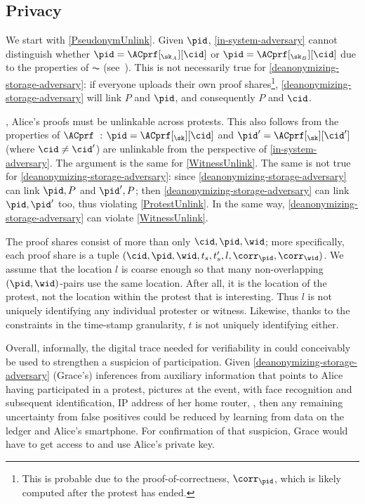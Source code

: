 \subsection{Privacy}

We start with \cref{PseudonymUnlink}.
Given \(\pid\), \cref{in-system-adversary} cannot distinguish whether \(\pid = 
  \ACprf[_{\sk_A}][\cid]\) or \(\pid = \ACprf[_{\sk_B}][\cid]\) due to the 
properties of \(\AC\) (see~\cite{HowToWinTheCloneWars}).
This is not necessarily true for \cref{deanonymizing-storage-adversary}:
if everyone uploads their own proof shares\footnote{%
  This is probable due to the proof-of-correctness, \(\corr_\pid\), which is 
  likely computed after the protest has ended.
}, \cref{deanonymizing-storage-adversary} will link \(P\) and \(\pid\), and 
consequently \(P\) and \(\cid\).

, Alice's proofs must be unlinkable across protests.
This also follows from the properties of 
\(\ACprf\)~\cite{HowToWinTheCloneWars}: \(\pid =  \ACprf[_{\sk}][\cid]\) and 
\(\pid' = \ACprf[_{\sk}][\cid']\) (where \(\cid \neq \cid'\)) are unlinkable 
from the perspective of \cref{in-system-adversary}.
The argument is the same for \cref{WitnessUnlink}.
The same is not true for \cref{deanonymizing-storage-adversary}: since 
\cref{deanonymizing-storage-adversary} can link \(\pid, P\) and \(\pid', P\); 
then \cref{deanonymizing-storage-adversary} can link \(\pid, \pid'\) too, thus 
violating \cref{ProtestUnlink}.
In the same way, \cref{deanonymizing-storage-adversary} can violate 
\cref{WitnessUnlink}.

The proof shares consist of more than only \(\cid, \pid, \wid\); more 
specifically, each proof share is a tuple \((\cid, \pid, \wid, t_s, t_s', l, 
  \corr_\pid, \corr_\wid)\).
We assume that the location \(l\) is coarse enough so that many non-overlapping 
\((\pid, \wid)\)-pairs use the same location.
After all, it is the location of the protest, not the location within the 
protest that is interesting.
Thus \(l\) is not uniquely identifying any individual protester or witness.
Likewise, thanks to the constraints in the time-stamp granularity,
\(t\) is not uniquely identifying either.

Overall, informally, the digital trace needed for verifiability in \CROCUS could
conceivably be used to strengthen a suspicion of
participation.
Given \cref{deanonymizing-storage-adversary} (Grace's) inferences from 
auxiliary information that points
to Alice having participated in a protest, \eg pictures at the
event, with face recognition and subsequent identification, IP address
of her home router, \etc, then any remaining uncertainty from false
positives could be reduced by learning from data on the ledger and
Alice's smartphone. %
For confirmation of that suspicion, Grace would have to get access to
and use Alice's private key.
